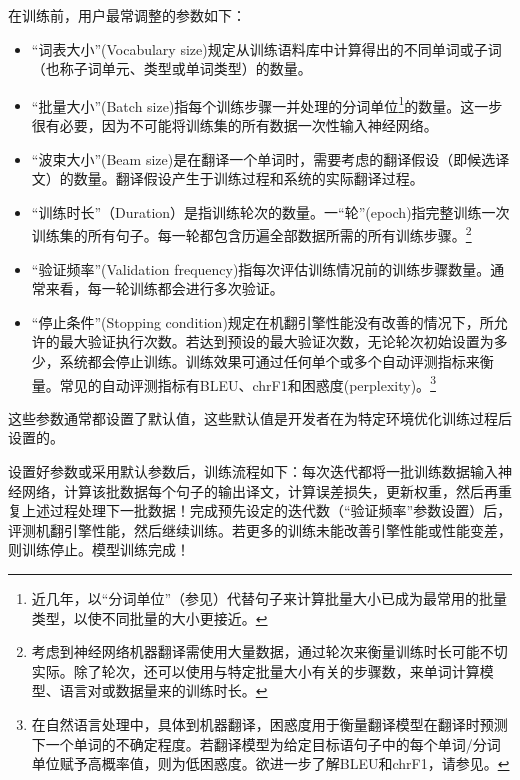 \documentclass[output=paper]{langscibook}
\begin{document}
在训练前，用户最常调整的参数如下：

\begin{itemize}

\item “词表大小”(Vocabulary size)规定从训练语料库中计算得出的不同单词或子词（也称子词单元、类型或单词类型）的数量。

\item “批量大小”(Batch size)指每个训练步骤一并处理的分词单位\footnote{近几年，以“分词单位”（参见）代替句子来计算批量大小已成为最常用的批量类型，以使不同批量的大小更接近。}的数量。这一步很有必要，因为不可能将训练集的所有数据一次性输入神经网络。

\item “波束大小”(Beam size)是在翻译一个单词时，需要考虑的翻译假设（即候选译文）的数量。翻译假设产生于训练过程和系统的实际翻译过程。

\item “训练时长”（Duration）是指训练轮次的数量。一“轮”(epoch)指完整训练一次训练集的所有句子。每一轮都包含历遍全部数据所需的所有训练步骤。\footnote{考虑到神经网络机器翻译需使用大量数据，通过轮次来衡量训练时长可能不切实际。除了轮次，还可以使用与特定批量大小有关的步骤数，来单词计算模型、语言对或数据量来的训练时长。}

\item “验证频率”(Validation frequency)指每次评估训练情况前的训练步骤数量。通常来看，每一轮训练都会进行多次验证。

\item “停止条件”(Stopping condition)规定在机翻引擎性能没有改善的情况下，所允许的最大验证执行次数。若达到预设的最大验证次数，无论轮次初始设置为多少，系统都会停止训练。训练效果可通过任何单个或多个自动评测指标来衡量。常见的自动评测指标有BLEU、chrF1和困惑度(perplexity)。\footnote{在自然语言处理中，具体到机器翻译，困惑度用于衡量翻译模型在翻译时预测下一个单词的不确定程度。若翻译模型为给定目标语句子中的每个单词/分词单位赋予高概率值，则为低困惑度。欲进一步了解BLEU和chrF1，请参见。}
\end{itemize}

这些参数通常都设置了默认值，这些默认值是开发者在为特定环境优化训练过程后设置的。

设置好参数或采用默认参数后，训练流程如下：每次迭代都将一批训练数据输入神经网络，计算该批数据每个句子的输出译文，计算误差损失，更新权重，然后再重复上述过程处理下一批数据！完成预先设定的迭代数（“验证频率”参数设置）后，评测机翻引擎性能，然后继续训练。若更多的训练未能改善引擎性能或性能变差，则训练停止。模型训练完成！
\end{document}
